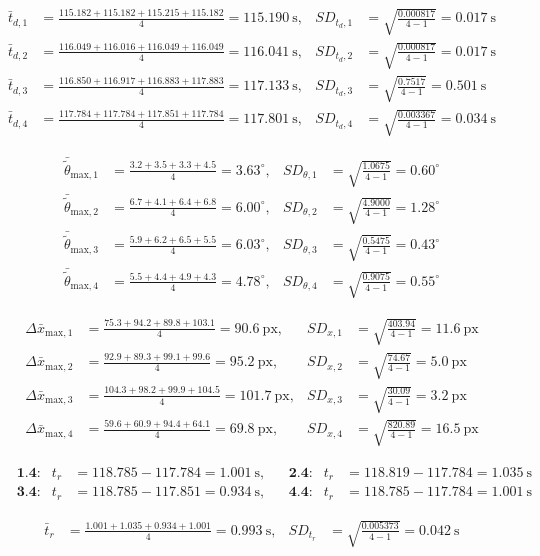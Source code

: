 \documentclass[11pt,a4paper]{article}
\begin{document}
\par
\begin{align*}
\bar{t}_{d,1} &= \frac{115.182+115.182+115.215+115.182}{4} = 115.190~\text{s}, &
SD_{t_d,1} &= \sqrt{\frac{0.000817}{4-1}} = 0.017~\text{s} \\
\bar{t}_{d,2} &= \frac{116.049+116.016+116.049+116.049}{4} = 116.041~\text{s}, &
SD_{t_d,2} &= \sqrt{\frac{0.000817}{4-1}} = 0.017~\text{s} \\
\bar{t}_{d,3} &= \frac{116.850+116.917+116.883+117.883}{4} = 117.133~\text{s}, &
SD_{t_d,3} &= \sqrt{\frac{0.7517}{4-1}} = 0.501~\text{s} \\
\bar{t}_{d,4} &= \frac{117.784+117.784+117.851+117.784}{4} = 117.801~\text{s}, &
SD_{t_d,4} &= \sqrt{\frac{0.003367}{4-1}} = 0.034~\text{s}
\end{align*}

\begin{align*}
\bar{\tilde{\theta}}_{\text{max},1} &= \frac{3.2+3.5+3.3+4.5}{4} = 3.63^\circ, &
SD_{\theta,1} &= \sqrt{\frac{1.0675}{4-1}} = 0.60^\circ \\
\bar{\tilde{\theta}}_{\text{max},2} &= \frac{6.7+4.1+6.4+6.8}{4} = 6.00^\circ, &
SD_{\theta,2} &= \sqrt{\frac{4.9000}{4-1}} = 1.28^\circ \\
\bar{\tilde{\theta}}_{\text{max},3} &= \frac{5.9+6.2+6.5+5.5}{4} = 6.03^\circ, &
SD_{\theta,3} &= \sqrt{\frac{0.5475}{4-1}} = 0.43^\circ \\
\bar{\tilde{\theta}}_{\text{max},4} &= \frac{5.5+4.4+4.9+4.3}{4} = 4.78^\circ, &
SD_{\theta,4} &= \sqrt{\frac{0.9075}{4-1}} = 0.55^\circ
\end{align*}

\begin{align*}
\Delta\bar{x}_{\text{max},1} &= \frac{75.3+94.2+89.8+103.1}{4} = 90.6~\text{px}, &
SD_{x,1} &= \sqrt{\frac{403.94}{4-1}} = 11.6~\text{px} \\
\Delta\bar{x}_{\text{max},2} &= \frac{92.9+89.3+99.1+99.6}{4} = 95.2~\text{px}, &
SD_{x,2} &= \sqrt{\frac{74.67}{4-1}} = 5.0~\text{px} \\
\Delta\bar{x}_{\text{max},3} &= \frac{104.3+98.2+99.9+104.5}{4} = 101.7~\text{px}, &
SD_{x,3} &= \sqrt{\frac{30.09}{4-1}} = 3.2~\text{px} \\
\Delta\bar{x}_{\text{max},4} &= \frac{59.6+60.9+94.4+64.1}{4} = 69.8~\text{px}, &
SD_{x,4} &= \sqrt{\frac{820.89}{4-1}} = 16.5~\text{px}
\end{align*}

\begin{align*}
&\textbf{1.4:} & t_r &= 118.785-117.784 = 1.001~\text{s}, &
&\textbf{2.4:} & t_r &= 118.819-117.784 = 1.035~\text{s} \\
&\textbf{3.4:} & t_r &= 118.785-117.851 = 0.934~\text{s}, &
&\textbf{4.4:} & t_r &= 118.785-117.784 = 1.001~\text{s}
\end{align*}

\begin{align*}
\bar{t}_r &= \frac{1.001+1.035+0.934+1.001}{4} = 0.993~\text{s}, &
SD_{t_r} &= \sqrt{\frac{0.005373}{4-1}} = 0.042~\text{s}
\end{align*}
\end{document}
